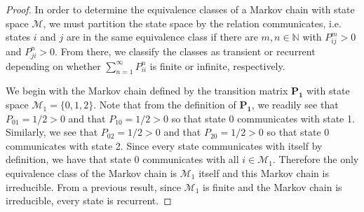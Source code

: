 \begin{proof}
  In order to determine the equivalence classes of a Markov chain with state space $\mathcal{M}$,
  we must partition the state space by the relation communicates, i.e.
  states $i$ and $j$ are in the same equivalence class if there are $m, n \in \mathbb{N}$ with $P_{ij}^m > 0$ and $P_{ji}^n > 0$.
  From there, we classify the classes as transient or recurrent depending on whether
  $\sum_{n=1}^\infty P_{ii}^n$ is finite or infinite, respectively.

  We begin with the Markov chain defined by the transition matrix $\boldsymbol{P_1}$ with state space $\mathcal{M}_1 = \{0, 1, 2\}$.
  Note that from the definition of $\boldsymbol{P_1}$, we readily see that $P_{01} = 1/2 > 0$ and that $P_{10} = 1/2 > 0$ so that state 0 communicates with state 1.
  Similarly, we see that $P_{02} = 1/2 > 0$ and that $P_{20} = 1/2 > 0$ so that state 0 communicates with state 2. Since
  every state communicates with itself by definition, we have that state 0 communicates with all $i\in\mathcal{M}_1$.
  Therefore the only equivalence class of the Markov chain is $\mathcal{M}_1$ itself and this Markov chain is
  irreducible. From a previous result, since $\mathcal{M}_1$ is finite and the Markov chain is irreducible,
  every state is recurrent.


\end{proof}
